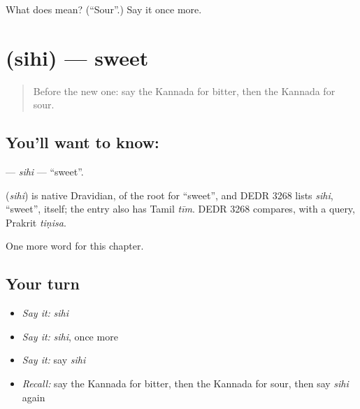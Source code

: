 \begin{tcolorbox}[breakable,colback=teal!4,colframe=teal!35!black,title={Before you move on}]
What does  mean? (\textquotedblleft{}Sour\textquotedblright{}.) Say it once more.
\end{tcolorbox}
\section[\texorpdfstring{\kn{ಸಿಹಿ} (sihi)}{ಸಿಹಿ (sihi)}]{ (sihi) — sweet}

\label{lesson:KA-C145-sihi}



\begin{quote}
Before the new one: say the Kannada for bitter, then the Kannada for sour.
\end{quote}

\subsection*{You'll want to know: }
\textbf{} — \emph{sihi} — \textquotedblleft{}sweet\textquotedblright{}.

\begin{cousinweb}
\textbf{} (\emph{sihi}) is native Dravidian, of the root for \textquotedblleft{}sweet\textquotedblright{}, and DEDR 3268 lists \emph{sihi}, \textquotedblleft{}sweet\textquotedblright{}, itself; the entry also has Tamil \emph{tīm}. DEDR 3268 compares, with a query, Prakrit \emph{tiṇisa}.
\end{cousinweb}

\begin{grammarlens}[title={What you've built}]
One more word for this chapter.
\end{grammarlens}

\subsection*{Your turn}
\begin{itemize}
\raggedright
  \item \emph{Say it:} \emph{sihi}
  \item \emph{Say it:} \emph{sihi}, once more
  \item \emph{Say it:} say \emph{sihi}
  \item \emph{Recall:} say the Kannada for bitter, then the Kannada for sour, then say \emph{sihi} again
\end{itemize}

